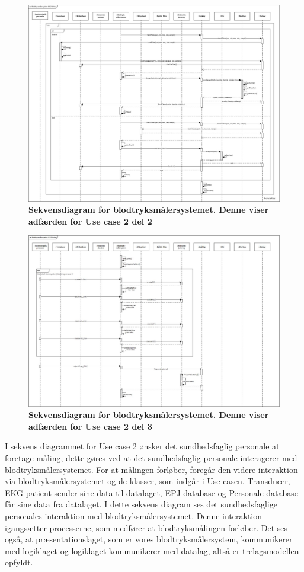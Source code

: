 \begin{figure}[H]
\includegraphics[width =1.0\textwidth , center]{billeder/sdUC2_2}
\caption{\textbf{Sekvensdiagram for blodtryksmålersystemet. Denne viser adfærden for Use case 2 del 2}}
\end{figure}
\begin{figure}[H]
\includegraphics[width =1.0\textwidth , center]{billeder/sdUC2_3}
\caption{\textbf{Sekvensdiagram for blodtryksmålersystemet. Denne viser adfærden for Use case 2 del 3}}
\end{figure}
I sekvens diagrammet for Use case 2 ønsker det sundhedsfaglig personale at foretage måling, dette gøres ved at det sundhedsfaglig personale interagerer med blodtryksmålersystemet. For at målingen forløber, foregår den videre interaktion via blodtryksmålersystemet og de klasser, som indgår i Use casen. Transducer, EKG patient sender sine data til datalaget, EPJ database og Personale database får sine data fra datalaget. I dette sekvens diagram ses det sundhedsfaglige personales interaktion med blodtryksmålersystemet. Denne interaktion igangsætter processerne, som medfører at blodtryksmålingen forløber. Det ses også, at præsentationslaget, som er vores blodtryksmålersystem, kommunikerer med logiklaget og logiklaget kommunikerer med datalag, altså er trelagsmodellen opfyldt. \\\\
